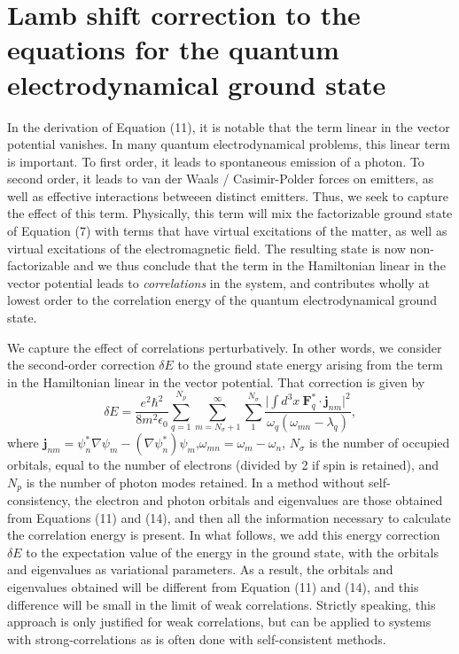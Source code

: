 \documentclass[aps,prb,onecolumn,
	groupedaddress,superscriptaddress,
	amsfonts,amssymb,amsmath,floatfix,
	citeautoscript]{revtex4-1}
\begin{document}
\section{Lamb shift correction to the equations for the quantum electrodynamical ground state}

In the derivation of Equation (11), it is notable that the term linear in the vector potential vanishes. In many quantum electrodynamical problems, this linear term is important. To first order, it leads to spontaneous emission of a photon. To second order, it leads to van der Waals / Casimir-Polder forces on emitters, as well as effective interactions betweeen distinct emitters. Thus, we seek to capture the effect of this term. Physically, this term will mix the factorizable ground state of Equation (7) with terms that have virtual excitations of the matter, as well as virtual excitations of the electromagnetic field. The resulting state is now non-factorizable and we thus conclude that the term in the Hamiltonian linear in the vector potential leads to \textit{correlations} in the system, and contributes wholly at lowest order to the correlation energy of the quantum electrodynamical ground state.

We capture the effect of correlations perturbatively. In other words, we consider the second-order correction $\delta E$ to the ground state energy arising from the term in the Hamiltonian linear in the vector potential. That correction is given by
\begin{equation}
\delta E = \frac{e^2\hbar^2}{8m^2\epsilon_0}\sum\limits_{q=1}^{N_p}\sum_{m=N_{\sigma}+1}^{\infty}\sum\limits_{1}^{N_{\sigma}} \frac{\Big| \int d^3x~\mathbf{F}_q^*\cdot\mathbf{j}_{nm}\Big|^2}{\omega_q(\omega_{mn} -\lambda_q)},
\end{equation}
where $\mathbf{j}_{nm} = \psi^*_n\nabla\psi_m - (\nabla\psi^*_n)\psi_m$,$\omega_{mn} = \omega_m - \omega_n$, $N_{\sigma}$ is the number of occupied orbitals, equal to the number of electrons (divided by 2 if spin is retained), and $N_p$ is the number of photon modes retained.  In a method without self-consistency, the electron and photon orbitals and eigenvalues are those obtained from Equations (11) and (14), and then all the information necessary to calculate the correlation energy is present. In what follows, we add this energy correction $\delta E$ to the expectation value of the energy in the ground state, with the orbitals and eigenvalues as variational parameters. As a result, the orbitals and eigenvalues obtained will be different from Equation (11) and (14), and this difference will be small in the limit of weak correlations. Strictly speaking, this approach is only justified for weak correlations, but can be applied to systems with strong-correlations as is often done with self-consistent methods. 
\end{document}
